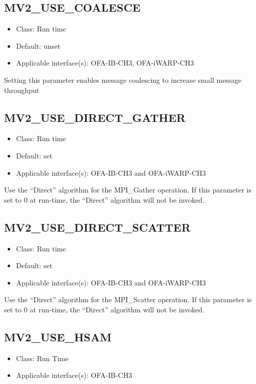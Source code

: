 \subsection{MV2\_USE\_COALESCE}
\begin{itemize}
    \item Class: Run time
    \item Default: unset
    \item Applicable interface(s): OFA-IB-CH3, OFA-iWARP-CH3
\end{itemize}
Setting this parameter enables message coalescing to increase small
message throughput 

\subsection{MV2\_USE\_DIRECT\_GATHER}
\label{def:mv2_use_direct_gather}
\begin{itemize}
    \item Class: Run time
    \item Default: set
    \item Applicable interface(s): OFA-IB-CH3 and OFA-iWARP-CH3
\end{itemize}
Use the ``Direct'' algorithm for the MPI\_Gather operation. If this parameter is 
set to 0 at run-time, the ``Direct'' algorithm will not be invoked. 


\subsection{MV2\_USE\_DIRECT\_SCATTER}
\label{def:mv2_use_direct_scatter}
\begin{itemize}
    \item Class: Run time
    \item Default: set
    \item Applicable interface(s): OFA-IB-CH3 and OFA-iWARP-CH3
\end{itemize}
Use the ``Direct'' algorithm for the MPI\_Scatter operation. If this parameter is 
set to 0 at run-time, the ``Direct'' algorithm will not be invoked. 

\subsection{MV2\_USE\_HSAM}
\label{def:mv2-use-hsam}
\begin{itemize}
	\item Class: Run Time
	\item Applicable interface(s): OFA-IB-CH3
\end{itemize}

